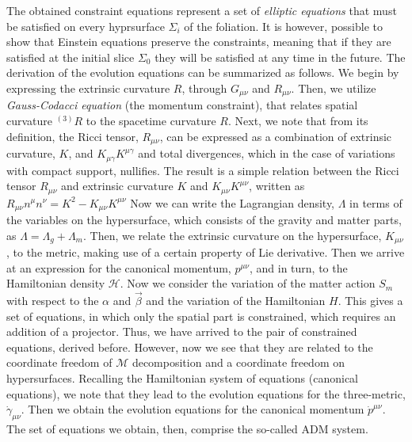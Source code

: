 {    %
    The obtained constraint equations represent a set of \textit{elliptic equations} that must be satisfied on every hyprsurface $\Sigma_i$ of the foliation. 
    It is however, possible to show that Einstein equations preserve the constraints, meaning that if they are satisfied at the initial slice $\Sigma_0$ they will be satisfied at any time in the future. 
    The derivation of the evolution equations can be summarized as follows. 
    We begin by expressing the extrinsic curvature $R$, through $G_{\mu\nu}$ and $R_{\mu\nu}$. 
    Then, we utilize \textit{Gauss-Codacci equation} (the momentum constraint), that relates spatial curvature $^{(3)}R$ to the spacetime curvature $R$.
    Next, we note that from its definition, the Ricci tensor, $R_{\mu\nu}$, can be expressed as a combination of extrinsic curvature, $K$, and $K_{\mu\gamma}K^{\mu\gamma}$ and total divergences, which in the case of variations with compact support, nullifies. 
    The result is a simple relation between the Ricci tensor $R_{\mu\nu}$ and extrinsic curvature $K$ and $K_{\mu\nu}K^{\mu\nu}$, written as 
    $R_{\mu\nu}n^{\mu}n^{\nu}= K^2 - K_{\mu\nu}K^{\mu\nu}$
    Now we can write the Lagrangian density, $\Lambda$ in terms of the variables on the hypersurface, which consists of the gravity and matter parts, as $\Lambda = \Lambda_g+\Lambda_m$. 
    Then, we relate the extrinsic curvature on the hypersurface, $K_{\mu\nu}$, to the metric, making use of a certain property of Lie derivative. 
    Then we arrive at an expression for the canonical momentum, $p^{\mu\nu}$, and in turn, to the Hamiltonian density $\mathcal{H}$.
    Now we consider the variation of the matter action $S_m$ with respect to the $\alpha$ and $\vec{\beta}$ and the variation of the Hamiltonian $H$.
    This gives a set of equations, in which only the spatial part is constrained, which requires an addition of a projector. Thus, we have arrived to the pair of constrained equations, derived before. However, now we see that they are related to the coordinate freedom of $\mathcal{M}$ decomposition and a coordinate freedom on hypersurfaces.
    Recalling the Hamiltonian system of equations (canonical equations), we note that they lead to the evolution equations for the three-metric, $\dot{\gamma}_{\mu\nu}$. Then we obtain the evolution equations for the canonical momentum $\dot{p}^{\mu\nu}$. The set of equations we obtain, then, comprise the so-called ADM system.
}
